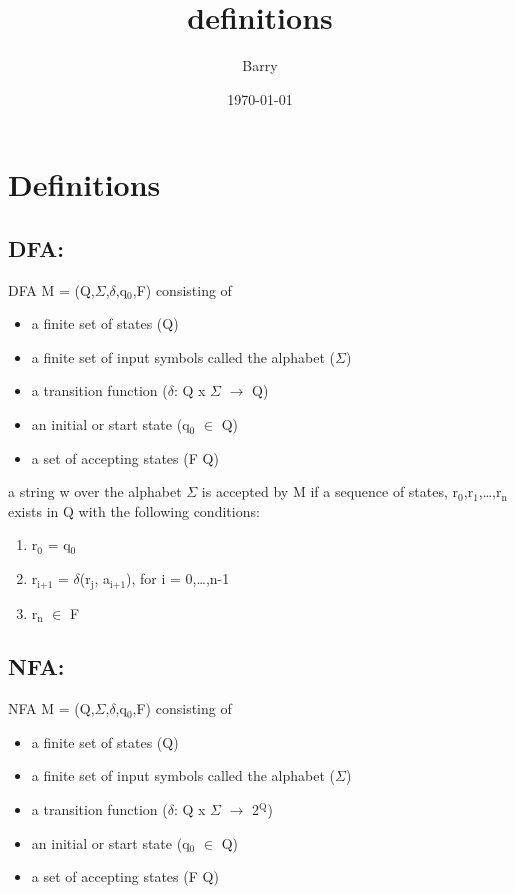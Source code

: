 \documentclass[11pt]{article}
\author{Barry }
\date{\today}
\title{definitions}
\begin{document}
\maketitle
\tableofcontents

\section{Definitions}
\label{sec-1}
\subsection{DFA:}
\label{sec-1-1}
DFA M = (Q,$\Sigma$,$\delta$,q$_{\text{0}}$,F) consisting of
\begin{itemize}
\item a finite set of states (Q)
\item a finite set of input symbols called the alphabet ($\Sigma$)
\item a transition function ($\delta$: Q x $\Sigma$ $\rightarrow$ Q)
\item an initial or start state (q$_{\text{0}}$ $\in$ Q)
\item a set of accepting states (F \subseteq Q)
\end{itemize}

a string w over the alphabet $\Sigma$ is accepted by M if a sequence of states, r$_{\text{0}}$,r$_{\text{1}}$,\ldots{},r$_{\text{n}}$ exists in Q with the following conditions:
\begin{center}
\begin{enumerate}
\item r$_{\text{0}}$ = q$_{\text{0}}$
\item r$_{\text{i+1}}$ = $\delta$(r$_{\text{j}}$, a$_{\text{i+1}}$), for i = 0,\ldots{},n-1
\item r$_{\text{n}}$ $\in$ F
\end{enumerate}
\end{center}

\subsection{NFA:}
\label{sec-1-2}
NFA M = (Q,$\Sigma$,$\delta$,q$_{\text{0}}$,F) consisting of
\begin{itemize}
\item a finite set of states (Q)
\item a finite set of input symbols called the alphabet ($\Sigma$)
\item a transition function ($\delta$: Q x $\Sigma$ $\rightarrow$ 2$^{\text{Q}}$)
\item an initial or start state (q$_{\text{0}}$ $\in$ Q)
\item a set of accepting states (F \subseteq Q)
\end{itemize}
\end{document}
